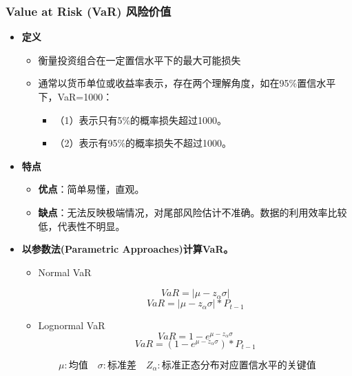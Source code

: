 \subsubsection{Value at Risk (VaR) 风险价值}
\begin{itemize}


    \item \textbf{定义}
    \begin{itemize}
        \item 衡量投资组合在一定置信水平下的最大可能损失
        \item 通常以货币单位或收益率表示，存在两个理解角度，如在95\%置信水平下，VaR=1000：
        \begin{itemize}
        \item （1）表示只有5\%的概率损失超过1000。
        \item （2）表示有95\%的概率损失不超过1000。
    \end{itemize}

    \end{itemize}

 
    \item \textbf{特点}
    \begin{itemize}
        \item \textbf{优点}：简单易懂，直观。
        \item \textbf{缺点}：无法反映极端情况，对尾部风险估计不准确。数据的利用效率比较低，代表性不明显。
    \end{itemize}

\item \textbf{ 以参数法(Parametric Approaches)计算VaR。}
        \begin{itemize}
            \item Normal VaR

        \[ VaR=\left| {\mu-z_\alpha \sigma} \right|\]
        \[ VaR=\left| {\mu-z_\alpha \sigma} \right|*P_{t-1}\]
        

\item Lognormal VaR
\[VaR=1-e^{\mu-z_{\alpha} \sigma}\]
\[VaR=(1-e^{\mu-z_{\alpha} \sigma})*P_{t-1}\]


\end{itemize}


\[\mu: \text{均值} \quad \sigma: \text{标准差} \quad Z_{\alpha}: \text{标准正态分布对应置信水平的关键值}
\]

\end{itemize}








